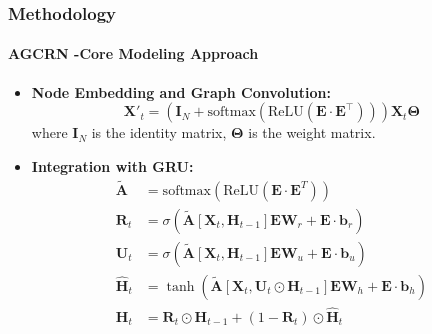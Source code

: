 \documentclass[light]{lutbeamer} %
\begin{document}
\begin{frame}
    \frametitle{Methodology}
    \framesubtitle{AGCRN \cite{bai2020}-Core Modeling Approach}
    \begin{itemize}
        \item \textbf{Node Embedding and Graph Convolution:}
              \[
                  \bm{X}'_t = \left(\bm{I}_N + \text{softmax}\left(\text{ReLU}\left(\bm{E} \cdot \bm{E}^\top\right)\right)\right) \bm{X}_t \bm{\Theta}
              \]
              where \(\bm{I}_N\) is the identity matrix, \(\bm{\Theta}\) is the weight matrix.
        \item \textbf{Integration with GRU:}
              \begin{equation}
                  \begin{split}
                      \tilde{\bm A} &= \text{softmax}(\text{ReLU}(\bm E\cdot \bm E^T)) \\
                      {\bm R_t} &= \sigma\left(\tilde{\bm A}[\bm X_t, \bm H_{t-1}]\bm E\bm W_r + \bm E\cdot\bm b_r \right)
                      \\
                      {\bm U_t} &= \sigma\left(\tilde{\bm A}[\bm X_t, \bm H_{t-1}]\bm E\bm W_u + \bm E\cdot\bm b_u \right)
                      \\
                      \hat{\bm H}_t &= \tanh\left(\tilde{\bm A}[\bm X_t, \bm U_t\odot\bm H_{t-1}]\bm E\bm W_h + \bm E\cdot\bm b_h \right)
                      \\
                      \bm H_t &= \bm R_t\odot \bm H_{t-1} + (1-\bm R_t)\odot \hat{\bm H}_t
                  \end{split}
              \end{equation}
    \end{itemize}
\end{frame}
\end{document}
